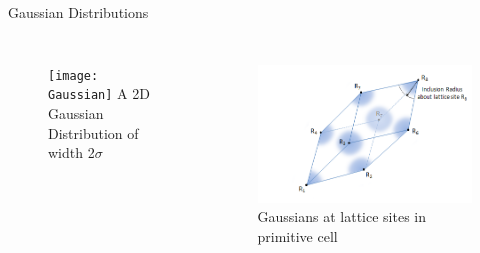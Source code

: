 \documentclass{beamer}
\begin{document}
       
    

\begin{frame}{Gaussian Distributions}
	\begin{columns}[t]
        \begin{figure}
            \centering
            \texttt{[image: Gaussian]}
            A 2D Gaussian Distribution of width 2$\sigma$
          \end{figure}
		 \begin{figure}
            \centering
            \includegraphics[width=1.02\columnwidth]{InclusionRadius.png}
            Gaussians at lattice sites in primitive cell
          \end{figure}
	\end{columns}	

	
\end{frame}
\end{document}
